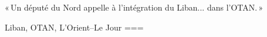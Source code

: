 « Un député du Nord appelle à l’intégration du Liban... dans l’OTAN. »

Liban, OTAN, L’Orient–Le Jour
===
\nocite{2025e}